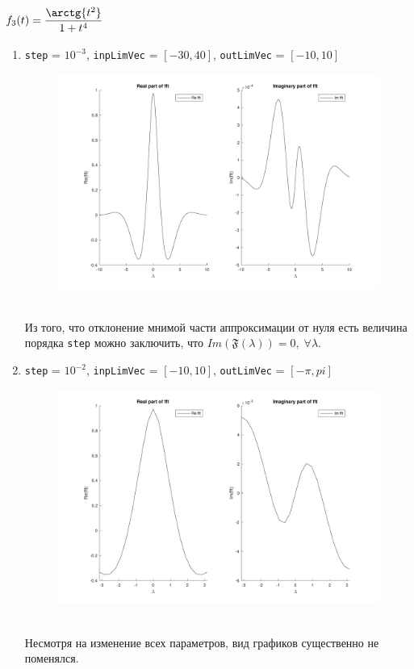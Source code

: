 \documentclass[11pt, oneside, draft]{article}
\numberwithin{equation}{section}
\newcommand \four[1][\lambda]{\mathfrak{F}(#1)}
\begin{document}
    \subsection{\( f_3(t) = \dfrac{\arctg{t^2}}{1 + t^4}\)} %
    \begin{enumerate}
        \item
        \label{it:f31}
        \texttt{step} = \(10^{-3}\), \texttt{inpLimVec} = \( [-30, 40] \), \texttt{outLimVec} = \( [-10, 10] \)
        \begin{figure}[!h]
            \centering
            \includegraphics[width=\linewidth]{f3fig1}
            \label{pic:f3:1}
        \end{figure} \\
        Из того, что отклонение мнимой части аппроксимации от нуля есть величина порядка \texttt{step} можно заключить,
        что \(Im(\four) = 0, \; \forall \lambda \). 
        \clearpage
        \item
        \label{it:f32}
        \texttt{step} = \(10^{-2}\), \texttt{inpLimVec} = \( [-10, 10] \), \texttt{outLimVec} = \( [-\pi, pi] \)
        \begin{figure}[!h]
            \centering
            \includegraphics[width=\linewidth]{f3fig2}
            \label{pic:f3:2}
        \end{figure} \\
        Несмотря на изменение всех параметров, вид графиков существенно не поменялся.
    \label{sub:f3}
    
    \end{enumerate}
    \appendix
\end{document}
